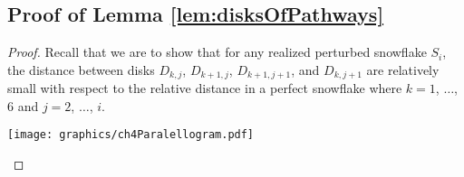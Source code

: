 \documentclass[10pt]{CSUNthesis}
\theoremstyle{plain}%
\theoremstyle{definition}
\theoremstyle{remark}
\begin{document}
\subsection{Proof of Lemma \ref{lem:disksOfPathways}}
\begin{proof}
Recall that we are to show that for any realized perturbed snowflake $S_i$, the distance between disks $D_{k,j}$, $D_{k+1,j}$, $D_{k+1,j+1}$, and $D_{k,j+1}$ are relatively small with respect to the relative distance in a perfect snowflake where $k = 1$, $\dots$, $6$ and $j = 2$, $\dots$, $i$.

\begin{minipage}{\linewidth}
\begin{center}
\texttt{[image: graphics/ch4Paralellogram.pdf]}
\label{fig:ch4Paralellogram.pdf}
\end{center}
\end{minipage}


\end{proof}


\end{document}
